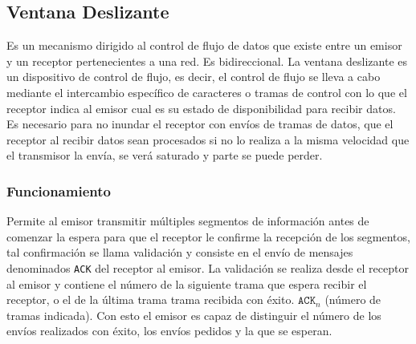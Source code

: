 \subsection*{Ventana Deslizante}
Es un mecanismo dirigido al control de flujo de datos que existe entre un emisor y un receptor pertenecientes a una red. Es bidireccional. La ventana deslizante es un dispositivo de control de flujo, es decir, el control de flujo se lleva a cabo mediante el intercambio específico de caracteres o tramas de control con lo que el receptor indica al emisor cual es su estado de disponibilidad para recibir datos. \\${ }$\\
Es necesario para no inundar el receptor con envíos de tramas de datos, que el receptor al recibir datos sean procesados si no lo realiza a la misma velocidad que el transmisor la envía, se verá saturado y parte se puede perder.
\subsubsection*{Funcionamiento}
Permite al emisor transmitir múltiples segmentos de información antes de comenzar la espera para que el receptor le confirme la recepción de los segmentos, tal confirmación se llama validación y consiste en el envío de mensajes denominados \texttt{ACK} del receptor al emisor. La validación se realiza desde el receptor al emisor y contiene el número de la siguiente trama que espera recibir el receptor, o el de la última trama trama recibida con éxito. $\texttt{ACK}_n$ (número de tramas indicada). Con esto el emisor es capaz de distinguir el número de los envíos realizados con éxito, los envíos pedidos y la que se esperan.
